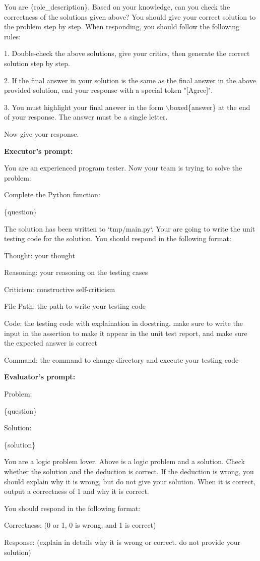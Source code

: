 \begin{tcolorbox}[colback=gray!10!white, colframe=black!70!white, breakable]
You are \{role\_description\}. Based on your knowledge, can you check the correctness of the solutions given above? You should give your correct solution to the problem step by step. When responding, you should follow the following rules:

1. Double-check the above solutions, give your critics, then generate the correct solution step by step.

2. If the final answer in your solution is the same as the final answer in the above provided solution, end your response with a special token "[Agree]".

3. You must highlight your final answer in the form $\backslash$boxed\{answer\} at the end of your response. The answer must be a single letter.

Now give your response.

\textbf{Executor's prompt:}

You are an experienced program tester. Now your team is trying to solve the problem: 

Complete the Python function:

\{question\}

The solution has been written to `tmp/main.py`. Your are going to write the unit testing code for the solution. You should respond in the following format:

Thought: your thought

Reasoning: your reasoning on the testing cases

Criticism: constructive self-criticism

File Path: the path to write your testing code

Code: the testing code with explaination in docstring. make sure to write the input in the assertion to make it appear in the unit test report, and make sure the expected answer is correct

Command: the command to change directory and execute your testing code

\textbf{Evaluator's prompt:}

Problem:

\{question\}

Solution: 

\{solution\}

You are a logic problem lover. Above is a logic problem and a solution. Check whether the solution and the deduction is correct. If the deduction is wrong, you should explain why it is wrong, but do not give your solution. When it is correct, output a correctness of 1 and why it is correct.

You should respond in the following format:

Correctness: (0 or 1, 0 is wrong, and 1 is correct)

Response: (explain in details why it is wrong or correct. do not provide your solution)
\end{tcolorbox}

